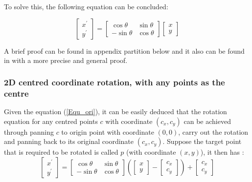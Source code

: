 \par\noindent
To solve this, the following equation can be concluded:

\begin{equation} \label{Equ_ori}
  \begin{bmatrix}
   x^{'} \\ y^{'}
   \end{bmatrix} =   \begin{bmatrix}
      \cos\theta & \sin\theta \\
      -\sin\theta & \cos\theta
    \end{bmatrix} \begin{bmatrix}
      x \\ y
     \end{bmatrix}
\end{equation}


\par\noindent
A brief proof can be found in appendix partition below and it also can be found in \cite{Mitnote09} with a more precise and general proof.


\subsubsection{2D centred coordinate rotation, with any points as the centre}
Given the equation (\ref{Equ_ori}), it can be easily
deduced that the rotation equation for any centred points $c$ with coordinate $(c_{x}, c_{y})$ can be achieved through
panning $c$ to origin point with coordinate $(0, 0)$, carry out the rotation and panning back to its original coordinate $(c_{x}, c_{y})$.
Suppose the target point that is required to be rotated is called $p$ (with coordinate $(x, y)$), it then has :
\begin{equation} \label{Equ_anycen}
  \begin{bmatrix}
   x^{'} \\ y^{'}
   \end{bmatrix} =   \begin{bmatrix}
      \cos\theta & \sin\theta \\
      -\sin\theta & \cos\theta
    \end{bmatrix} \left(\begin{bmatrix}
      x \\ y
     \end{bmatrix} - \begin{bmatrix}
       c_{x} \\ c_{y}
     \end{bmatrix}\right) + \begin{bmatrix}
        c_{x} \\ c_{y}
       \end{bmatrix}
\end{equation}

